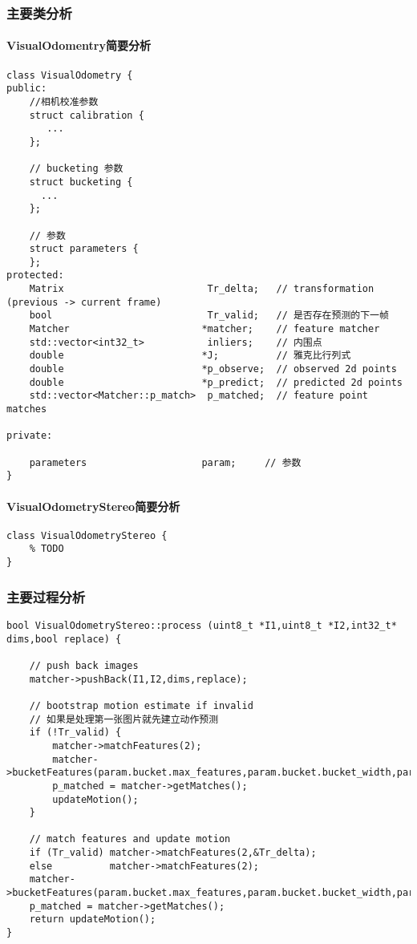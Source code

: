 \documentclass[UTF8]{ctexart}
\begin{document}
    \subsubsection{主要类分析}
    \paragraph{VisualOdomentry简要分析}
    \begin{verbatim}
class VisualOdometry {
public:
    //相机校准参数
    struct calibration {  
       ...
    };
  
    // bucketing 参数
    struct bucketing {  
      ...
    };
  
    // 参数
    struct parameters {
    };
protected:
    Matrix                         Tr_delta;   // transformation (previous -> current frame)  
    bool                           Tr_valid;   // 是否存在预测的下一帧
    Matcher                       *matcher;    // feature matcher
    std::vector<int32_t>           inliers;    // 内围点
    double                        *J;          // 雅克比行列式
    double                        *p_observe;  // observed 2d points
    double                        *p_predict;  // predicted 2d points
    std::vector<Matcher::p_match>  p_matched;  // feature point matches
    
private:
    
    parameters                    param;     // 参数
}
    \end{verbatim}
    \paragraph{VisualOdometryStereo简要分析}
    \begin{verbatim}
class VisualOdometryStereo {
    % TODO
}
    \end{verbatim}
    \subsubsection{主要过程分析}
    \begin{verbatim}
bool VisualOdometryStereo::process (uint8_t *I1,uint8_t *I2,int32_t* dims,bool replace) {

    // push back images
    matcher->pushBack(I1,I2,dims,replace);
    
    // bootstrap motion estimate if invalid
    // 如果是处理第一张图片就先建立动作预测
    if (!Tr_valid) {
        matcher->matchFeatures(2);
        matcher->bucketFeatures(param.bucket.max_features,param.bucket.bucket_width,param.bucket.bucket_height);                          
        p_matched = matcher->getMatches();
        updateMotion();
    }
    
    // match features and update motion
    if (Tr_valid) matcher->matchFeatures(2,&Tr_delta);
    else          matcher->matchFeatures(2);
    matcher->bucketFeatures(param.bucket.max_features,param.bucket.bucket_width,param.bucket.bucket_height);                          
    p_matched = matcher->getMatches();
    return updateMotion();
}
        
    \end{verbatim}
\end{document}
